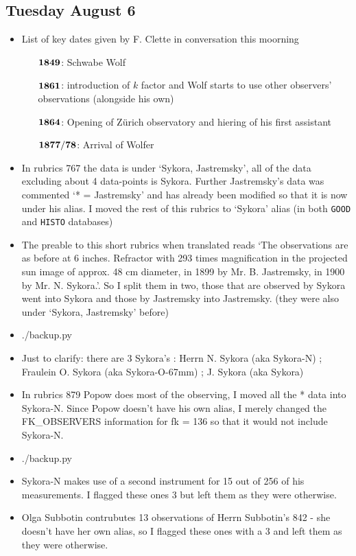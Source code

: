 \documentclass[12pt]{article}
\begin{document}
\subsection{Tuesday August 6}
\begin{itemize}
    \item List of key dates given by F. Clette in conversation this moorning
    \begin{itemize}
        \item[$\bold{1849}$:] Schwabe Wolf
        \item[$\bold{1861}$:] introduction of $k$ factor and Wolf starts to use other observers' observations (alongside his own)
        \item[$\bold{1864}$:] Opening of Zürich observatory and hiering of his first assistant
        \item[$\bold{1877 / 78}$:] Arrival of Wolfer
    \end{itemize}
    \item In rubrics 767 the data is under `Sykora, Jastremsky', all of the data excluding about 4 data-points is Sykora. Further Jastremsky's data was commented `* = Jastremsky' and has already been modified so that it is now under his alias. I moved the rest of this rubrics to `Sykora' alias (in both \texttt{GOOD} and \texttt{HISTO} databases)
    \item The preable to this short rubrics when translated reads `The observations are as before at 6 inches. Refractor with 293 times magnification in the projected sun image of approx. 48 cm diameter, in 1899 by Mr. B. Jastremsky, in 1900 by Mr. N. Sykora.'. So I split them in two, those that are observed by Sykora went into Sykora and those by Jastremsky into Jastremsky. (they were also under `Sykora, Jastremsky' before)
    \item ./backup.py
    \item Just to clarify: there are 3 Sykora's : Herrn N. Sykora (aka Sykora-N) ; Fraulein O. Sykora (aka Sykora-O-67mm) ; J. Sykora (aka Sykora)
    \item In rubrics 879 Popow does most of the observing, I moved all the * data into Sykora-N. Since Popow doesn't have his own alias, I merely changed the FK\_OBSERVERS information for fk = 136 so that it would not include Sykora-N. 
    \item ./backup.py
    \item Sykora-N makes use of a second instrument for 15 out of 256 of his measurements. I flagged these ones 3 but left them as they were otherwise.
    \item Olga Subbotin contrubutes 13 observations of Herrn Subbotin's 842 - she doesn't have her own alias, so I flagged these ones with a 3 and left them as they were otherwise.

\end{itemize}
\end{document}
